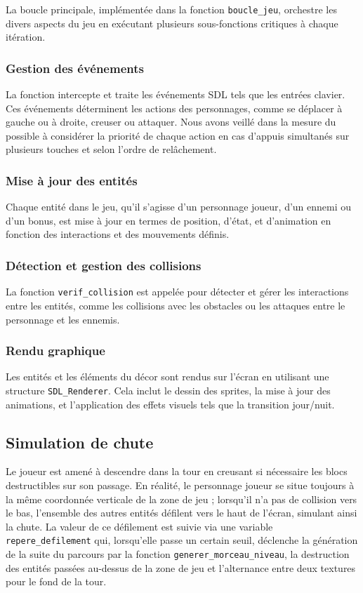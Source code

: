 \documentclass[a4paper,12pt]{article}
\begin{document}
La boucle principale, implémentée dans la fonction \texttt{boucle\_jeu}, orchestre les divers aspects du jeu en exécutant plusieurs sous-fonctions critiques à chaque itération.

\subsubsection{Gestion des événements}
La fonction intercepte et traite les événements SDL tels que les entrées clavier. Ces événements déterminent les actions des personnages, comme se déplacer à gauche ou à droite, creuser ou attaquer. Nous avons veillé dans la mesure du possible à considérer la priorité de chaque action en cas d’appuis simultanés sur plusieurs touches et selon l’ordre de relâchement.
    
\subsubsection{Mise à jour des entités}
Chaque entité dans le jeu, qu'il s'agisse d'un personnage joueur, d'un ennemi ou d'un bonus, est mise à jour en termes de position, d'état, et d'animation en fonction des interactions et des mouvements définis.
    
\subsubsection{Détection et gestion des collisions}
La fonction \texttt{verif\_collision} est appelée pour détecter et gérer les interactions entre les entités, comme les collisions avec les obstacles ou les attaques entre le personnage et les ennemis.
    
\subsubsection{Rendu graphique}
Les entités et les éléments du décor sont rendus sur l'écran en utilisant une structure \texttt{SDL\_Renderer}. Cela inclut le dessin des sprites, la mise à jour des animations, et l'application des effets visuels tels que la transition jour/nuit.

\subsection{Simulation de chute}

Le joueur est amené à descendre dans la tour en creusant si nécessaire les blocs destructibles sur son passage.
En réalité, le personnage joueur se situe toujours à la même coordonnée verticale de la zone de jeu ; lorsqu’il n’a pas de collision vers le bas, l’ensemble des autres entités défilent vers le haut de l’écran, simulant ainsi la chute.
La valeur de ce défilement est suivie via une variable \texttt{repere\_defilement} qui, lorsqu’elle passe un certain seuil, déclenche la génération de la suite du parcours par la fonction \texttt{generer\_morceau\_niveau}, la destruction des entités passées au-dessus de la zone de jeu et l’alternance entre deux textures pour le fond de la tour.
\end{document}
